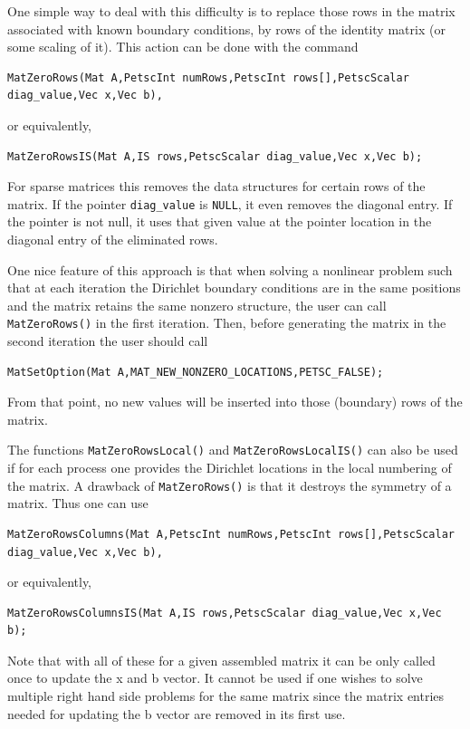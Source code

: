 One simple way to deal with this difficulty is to replace those rows in the
matrix associated with known boundary conditions, by rows of the
identity matrix (or some scaling of it). This action can be done with
the command
\begin{lstlisting}
MatZeroRows(Mat A,PetscInt numRows,PetscInt rows[],PetscScalar diag_value,Vec x,Vec b),
\end{lstlisting}
or equivalently,
\begin{lstlisting}
MatZeroRowsIS(Mat A,IS rows,PetscScalar diag_value,Vec x,Vec b);
\end{lstlisting}
For sparse matrices this removes the data structures for certain rows
of the matrix. If the pointer \lstinline{diag_value} is \lstinline{NULL}, it
even removes the diagonal entry. If the pointer is not null, it uses that
given value at the pointer location
in the diagonal entry of the eliminated rows.

One nice feature of this approach is that when solving a nonlinear problem
such that at each iteration the Dirichlet boundary conditions are in the
same positions and the matrix retains the same nonzero structure, the user
can call \lstinline{MatZeroRows()} in the first iteration. Then, before generating
the matrix in the second iteration the user should call
\begin{lstlisting}
MatSetOption(Mat A,MAT_NEW_NONZERO_LOCATIONS,PETSC_FALSE);
\end{lstlisting}
From that point,
no new values will be inserted into those (boundary) rows of
the matrix. 

The functions \lstinline{MatZeroRowsLocal()} and \lstinline{MatZeroRowsLocalIS()} can also be used if for each process one provides the Dirichlet locations in the local numbering of the matrix.
A drawback of \lstinline{MatZeroRows()} is that it destroys the symmetry of a matrix. Thus one can use
\begin{lstlisting}
MatZeroRowsColumns(Mat A,PetscInt numRows,PetscInt rows[],PetscScalar diag_value,Vec x,Vec b),
\end{lstlisting}
or equivalently,
\begin{lstlisting}
MatZeroRowsColumnsIS(Mat A,IS rows,PetscScalar diag_value,Vec x,Vec b);
\end{lstlisting}
Note that with all of these for a given assembled matrix it can be
only called once to update the x and b vector. It cannot be used if
one wishes to solve multiple right hand side problems for the same
matrix since the matrix entries needed for updating the b vector are
removed in its first use.

